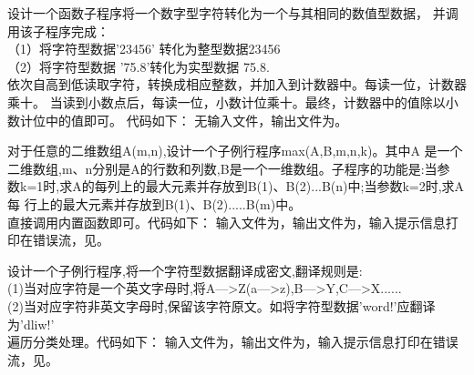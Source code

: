\documentclass{ctexart}
\begin{document}
\maketitle

\begin{answer}
    
        设计一个函数子程序将一个数字型字符转化为一个与其相同的数值型数据，
        并调用该子程序完成：\\
        （1）将字符型数据’23456’ 转化为整型数据23456 \\
        （2）将字符型数据 ’75.8’转化为实型数据 75.8.\\
        
        依次自高到低读取字符，转换成相应整数，并加入到计数器中。每读一位，计数器乘十。
        当读到小数点后，每读一位，小数计位乘十。最终，计数器中的值除以小数计位中的值即可。
        代码如下：
        无输入文件，输出文件为。

        对于任意的二维数组A(m,n),设计一个子例行程序max(A,B,m,n,k)。其中A 是一个二维数组,m、n分别是A的行数和列数,B是一个一维数组。子程序的功能是:当参 数k=1时,求A的每列上的最大元素并存放到B(1)、B(2)...B(n)中;当参数k=2时,求A每 行上的最大元素并存放到B(1)、B(2).....B(m)中。\\

        直接调用内置函数即可。代码如下：
        输入文件为，输出文件为，输入提示信息打印在错误流，见。

        设计一个子例行程序,将一个字符型数据翻译成密文,翻译规则是:\\
(1)当对应字符是一个英文字母时,将A—>Z(a—>z),B—>Y,C—>X......\\
(2)当对应字符非英文字母时,保留该字符原文。如将字符型数据’word!’应翻译 为’dliw!’\\
        
        遍历分类处理。代码如下：
        输入文件为，输出文件为，输入提示信息打印在错误流，见。
\end{answer}
\end{document}

